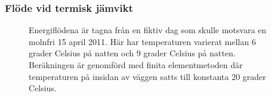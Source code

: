 \subsubsection{Flöde vid termisk jämvikt}



\begin{figure}
\centering

\vspace{5mm}
\caption{Energiflödena är tagna från en fiktiv dag som skulle motsvara en molnfri
15 april 2011. Här har temperaturen varierat mellan 6 grader Celsius på natten och
9 grader Celsius på natten. Beräkningen är genomförd med finita elementmetoden där
temperaturen på insidan av väggen satts till konstanta 20 grader Celsius.}
\end{figure}
